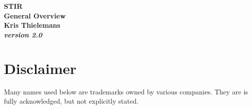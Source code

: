 \documentclass{article}
\begin{document}
\begin{center}

\begin{spacing}{1.5}
\textbf{{\huge STIR \\
General Overview}}\\
\textbf{Kris Thielemans}\\
\textbf{\textit{version 2.0}}


\end{spacing}

\end{center}

\tableofcontents 


\section{
Disclaimer}
Many names used below are trademarks owned by various companies. They are
is fully acknowledged, but not explicitly stated.
\end{document}

